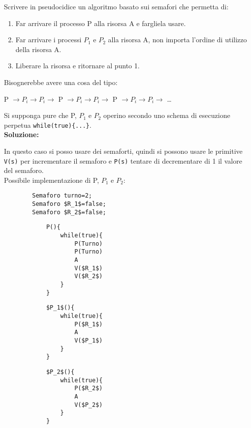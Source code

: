 \documentclass{article}
\begin{document}
    
    Scrivere in pseudocidice un algoritmo basato sui semafori che permetta di:
    \begin{enumerate}
        \item Far arrivare il processo P alla risorsa A e fargliela usare.
        \item Far arrivare i processi $P_1$ e $P_2$ alla risorsa A, non importa l'ordine di utilizzo della risorsa A.
        \item Liberare la risorsa e ritornare al punto 1.
    \end{enumerate}
    Bisognerebbe avere una cosa del tipo:
    \begin{center}
        P $\to P_i \to P_i \to$ P $\to P_i \to P_i \to$ P $\to P_i \to P_i \to$ \dots
    \end{center}
    Si supponga pure che P, $P_1$ e $P_2$ operino secondo uno schema di esecuzione perpetua \verb+while(true){...}+.\\
    \textbf{Soluzione:}


    In questo caso si posso usare dei semaforti, quindi si possono usare le primitive \verb+V(s)+ per incrementare il semaforo e \verb+P(s)+ tentare di decrementare di 1 il valore del semaforo.\\
    Possibile implementazione di P, $P_1$ e $P_2$:\\
    \begin{lstlisting}
        Semaforo turno=2;
        Semaforo $R_1$=false;
        Semaforo $R_2$=false;
    \end{lstlisting}
    \begin{minipage}[c]{0.3\textwidth}
        \begin{lstlisting}
            P(){
                while(true){
                    P(Turno)
                    P(Turno)
                    A
                    V($R_1$)
                    V($R_2$)
                }
            }
        \end{lstlisting}
    \end{minipage}
    \begin{minipage}[c]{0.3\textwidth}
        \begin{lstlisting}
            $P_1$(){
                while(true){
                    P($R_1$)
                    A
                    V($P_1$)
                }
            }
        \end{lstlisting}
    \end{minipage}
    \begin{minipage}[c]{0.3\textwidth}
        \begin{lstlisting}
            $P_2$(){
                while(true){
                    P($R_2$)
                    A
                    V($P_2$)
                }
            }
        \end{lstlisting}
    \end{minipage}
\end{document}
